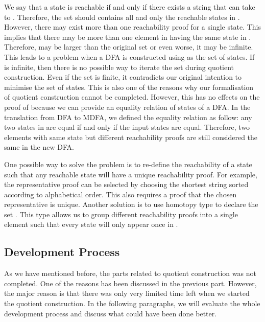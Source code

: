 \par We say that a state  is reachable if and
only if there exists a string  that can take  to
. Therefore, the set  should contains all and only the
reachable states in . However, there may exist more than one
reachability proof for a single state. This implies that there may be
more than one element in  having the same state in . Therefore, 
may be larger than the original set  or even worse, it may be
infinite. This leads to a problem when a DFA is constructed using
 as the set of states. If  is
infinite, then there is no possible way to iterate the set during 
quotient construction. Even if the set  is finite, it
contradicts our original intention to minimise the set of states. This is also one of the
reasons why our formalisation of quotient construction cannot be
completed. However, this has no effects on the proof of  because we can provide an equality relation of states of
a DFA. In the translation from DFA to MDFA, we defined
the equality relation as follow: any two states in  are equal if and only
if the input states are equal. Therefore, two elements with same state
but different reachability proofs are still considered the same in the new DFA. 

\par One possible way to solve the problem is to re-define the
reachability of a state such that any reachable state will have a
unique reachability proof. For example, the representative proof can
be selected by choosing the shortest string  sorted according
to alphabetical order. This also requires a proof that
the chosen representative is unique. Another solution is to use
homotopy type to declare the set . This type allows us to
group different reachability proofs into a single element such that
every state will only appear once in . 


\subsection{Development Process}
\par As we have mentioned before, the parts related to quotient
construction was not completed. One of the reasons
has been discussed in the previous part. However, the major reason is
that there was only very limited time left when we started the quotient
construction. In the following paragraphs, we will evaluate the whole
development process and discuss what could have been done better. 

